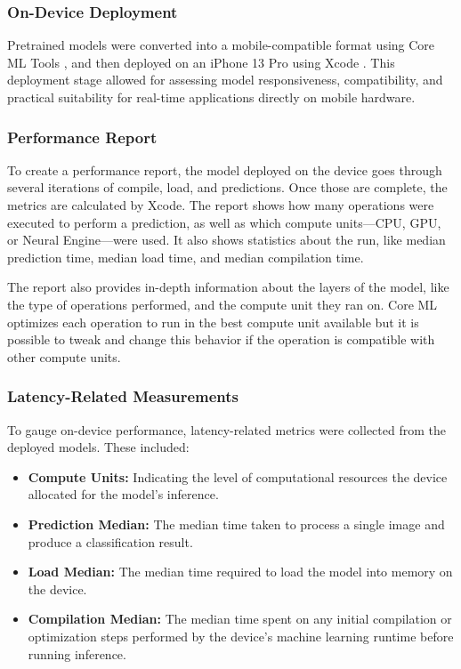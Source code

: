 \documentclass[12pt]{article}
\begin{document}
\subsubsection{On-Device Deployment}
Pretrained models were converted into a mobile-compatible format using Core ML Tools \cite{coremltools}, and then deployed on an iPhone 13 Pro using Xcode \cite{xcode}. This deployment stage allowed for assessing model responsiveness, compatibility, and practical suitability for real-time applications directly on mobile hardware.

\subsubsection{Performance Report}
To create a performance report, the model deployed on the device goes through several iterations of compile, load, and predictions. Once those are complete, the metrics are calculated by Xcode. The report shows how many operations were executed to perform a prediction, as well as which compute units—CPU, GPU, or Neural Engine—were used. It also shows statistics about the run, like median prediction time, median load time, and median compilation time.

The report also provides in-depth information about the layers of the model, like the type of operations performed, and the compute unit they ran on. Core ML optimizes each operation to run in the best compute unit available but it is possible to tweak and change this behavior if the operation is compatible with other compute units.

\subsubsection{Latency-Related Measurements}
To gauge on-device performance, latency-related metrics were collected from the deployed models. These included:
\begin{itemize}
    \item \textbf{Compute Units:} Indicating the level of computational resources the device allocated for the model’s inference.
    \item \textbf{Prediction Median:} The median time taken to process a single image and produce a classification result.
    \item \textbf{Load Median:} The median time required to load the model into memory on the device.
    \item \textbf{Compilation Median:} The median time spent on any initial compilation or optimization steps performed by the device’s machine learning runtime before running inference.
\end{itemize}
\end{document}
